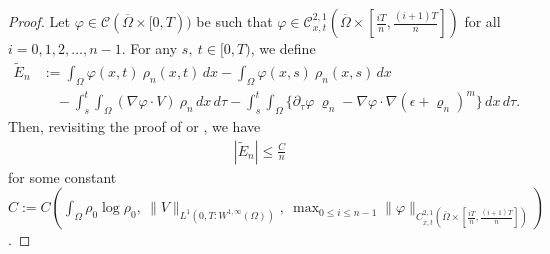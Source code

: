 \documentclass{amsart}
\numberwithin{equation}{section}
\newcommand{\calC}{{ \mathcal C  }}
\begin{document}
\begin{proof}
Let $\varphi \in \calC(\overline{\Omega} \times [0,T))$ be such that   $\varphi \in \calC^{2,1}_{x,t}(\overline{\Omega} \times [\frac{iT}{n}, \frac{(i+1)T}{n}])$ for all $i=0, 1, 2, \dots, n-1$.  
For any $s,~t \in [0,T)$, we define
\begin{equation*}
\begin{aligned}
\tilde{E}_n &:= \int_{\Omega}\varphi(x,t) ~\rho_n(x,t)\,dx - \int_{\Omega}\varphi(x,s) ~\rho_n(x,s)\,dx\\
  &\quad  - \int_{s}^{t} \int_{\Omega}  ( \nabla   \varphi \cdot V) ~\rho_n \,dx \,d\tau
  - \int_{s}^{t}
\int_{\Omega}  \{ \partial_\tau \varphi ~ \varrho_n - \nabla \varphi
\cdot \nabla (\epsilon +\varrho_n)^m \}\,dx \,d\tau.
\end{aligned}
\end{equation*}
Then, revisiting the proof of  \cite[Lemma 4.2]{KK-SIMA} or \cite[Lemma 5.7]{HKK01}, we have   
\begin{equation}\label{eq 12 : solving ODE}
\begin{aligned}
|\tilde{E}_n| \leq  \frac{C}{n}
\end{aligned}
\end{equation}
for some constant $C:=C (\int_\Omega \rho_0 \log \rho_0,  ~\|V\|_{L^1(0,T: W^{1,\infty}(\Omega))}, ~\max_{0\leq i\leq n-1} \|\varphi\|_{C^{2,1}_{x,t}(\bar{\Omega} \times [\frac{iT}{n}, \frac{(i+1)T}{n}])} )$.
 

\end{proof}
\end{document}
